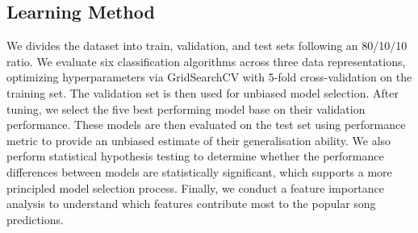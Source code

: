 \documentclass{article}
\begin{document}
{{{  

\subsection{Learning Method}
We divides the dataset into train, validation, and test sets following an 80/10/10 ratio. We evaluate six classification algorithms across three data representations, optimizing hyperparameters via GridSearchCV with 5-fold cross-validation on the training set. The validation set is then used for unbiased model selection. After tuning, we select the five best performing model base on their validation performance. These models are then evaluated on the test set using performance metric to provide an unbiased estimate of their generalisation ability. We also perform statistical hypothesis testing to determine whether the performance differences between models are statistically significant, which supports a more principled model selection process. Finally, we conduct a feature importance analysis to understand which features contribute most to the popular song predictions.  


\vspace{-1em}
}}}
\end{document}
